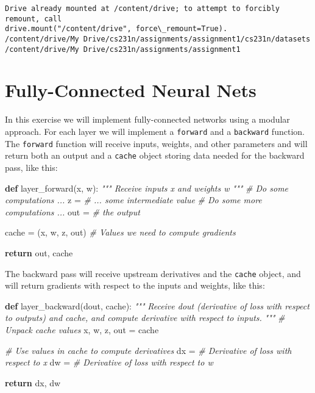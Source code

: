 \documentclass[11pt]{article}
\newenvironment{Shaded}{}{}
\newcommand{\KeywordTok}[1]{\textcolor[rgb]{0.00,0.44,0.13}{\textbf{{#1}}}}
\newcommand{\CommentTok}[1]{\textcolor[rgb]{0.38,0.63,0.69}{\textit{{#1}}}}
\newcommand{\NormalTok}[1]{{#1}}
\newcommand{\ControlFlowTok}[1]{\textcolor[rgb]{0.00,0.44,0.13}{\textbf{{#1}}}}
\newcommand{\OperatorTok}[1]{\textcolor[rgb]{0.40,0.40,0.40}{{#1}}}
\begin{document}
    \begin{Verbatim}[commandchars=\\\{\}]
Drive already mounted at /content/drive; to attempt to forcibly remount, call
drive.mount("/content/drive", force\_remount=True).
/content/drive/My Drive/cs231n/assignments/assignment1/cs231n/datasets
/content/drive/My Drive/cs231n/assignments/assignment1
    \end{Verbatim}

    \hypertarget{fully-connected-neural-nets}{%
\section{Fully-Connected Neural
Nets}\label{fully-connected-neural-nets}}

In this exercise we will implement fully-connected networks using a
modular approach. For each layer we will implement a \texttt{forward}
and a \texttt{backward} function. The \texttt{forward} function will
receive inputs, weights, and other parameters and will return both an
output and a \texttt{cache} object storing data needed for the backward
pass, like this:

\begin{Shaded}
\begin{Highlighting}[]
\KeywordTok{def}\NormalTok{ layer_forward(x, w):}
  \CommentTok{""" Receive inputs x and weights w """}
  \CommentTok{# Do some computations ...}
\NormalTok{  z }\OperatorTok{=} \CommentTok{# ... some intermediate value}
  \CommentTok{# Do some more computations ...}
\NormalTok{  out }\OperatorTok{=} \CommentTok{# the output}
   
\NormalTok{  cache }\OperatorTok{=}\NormalTok{ (x, w, z, out) }\CommentTok{# Values we need to compute gradients}
   
  \ControlFlowTok{return}\NormalTok{ out, cache}
\end{Highlighting}
\end{Shaded}

The backward pass will receive upstream derivatives and the
\texttt{cache} object, and will return gradients with respect to the
inputs and weights, like this:

\begin{Shaded}
\begin{Highlighting}[]
\KeywordTok{def}\NormalTok{ layer_backward(dout, cache):}
  \CommentTok{"""}
\CommentTok{  Receive dout (derivative of loss with respect to outputs) and cache,}
\CommentTok{  and compute derivative with respect to inputs.}
\CommentTok{  """}
  \CommentTok{# Unpack cache values}
\NormalTok{  x, w, z, out }\OperatorTok{=}\NormalTok{ cache}
  
  \CommentTok{# Use values in cache to compute derivatives}
\NormalTok{  dx }\OperatorTok{=} \CommentTok{# Derivative of loss with respect to x}
\NormalTok{  dw }\OperatorTok{=} \CommentTok{# Derivative of loss with respect to w}
  
  \ControlFlowTok{return}\NormalTok{ dx, dw}
\end{Highlighting}
\end{Shaded}
\end{document}
